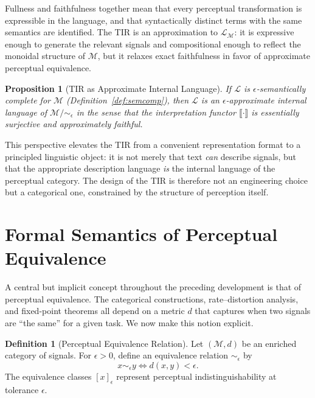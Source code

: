 \documentclass[11pt,a4paper]{article}
\newtheorem{proposition}[theorem]{Proposition}
\theoremstyle{definition}
\newtheorem{definition}[theorem]{Definition}
\theoremstyle{remark}
\begin{document}
Fullness and faithfulness together mean that every perceptual transformation is expressible in the language, and that syntactically distinct terms with the same semantics are identified. The TIR is an approximation to $\mathcal{L}_{\mathcal{M}}$: it is expressive enough to generate the relevant signals and compositional enough to reflect the monoidal structure of $\mathcal{M}$, but it relaxes exact faithfulness in favor of approximate perceptual equivalence.

\begin{proposition}[TIR as Approximate Internal Language]
If $\mathcal{L}$ is $\epsilon$-semantically complete for $\mathcal{M}$ (Definition~\ref{def:semcomp}), then $\mathcal{L}$ is an $\epsilon$-approximate internal language of $\mathcal{M}/\!\sim_\epsilon$ in the sense that the interpretation functor $\llbracket \cdot \rrbracket$ is essentially surjective and approximately faithful.
\end{proposition}

This perspective elevates the TIR from a convenient representation format to a principled linguistic object: it is not merely that text \emph{can} describe signals, but that the appropriate description language \emph{is} the internal language of the perceptual category. The design of the TIR is therefore not an engineering choice but a categorical one, constrained by the structure of perception itself.

\section{Formal Semantics of Perceptual Equivalence}
\label{sec:perceptual_equivalence}

A central but implicit concept throughout the preceding development is that of perceptual equivalence. The categorical constructions, rate--distortion analysis, and fixed-point theorems all depend on a metric $d$ that captures when two signals are ``the same'' for a given task. We now make this notion explicit.

\begin{definition}[Perceptual Equivalence Relation]
Let $(\mathcal{M}, d)$ be an enriched category of signals. For $\epsilon > 0$, define an equivalence relation $\sim_\epsilon$ by
\[
x \sim_\epsilon y \iff d(x,y) < \epsilon.
\]
The equivalence classes $[x]_\epsilon$ represent perceptual indistinguishability at tolerance $\epsilon$.
\end{definition}
\end{document}
